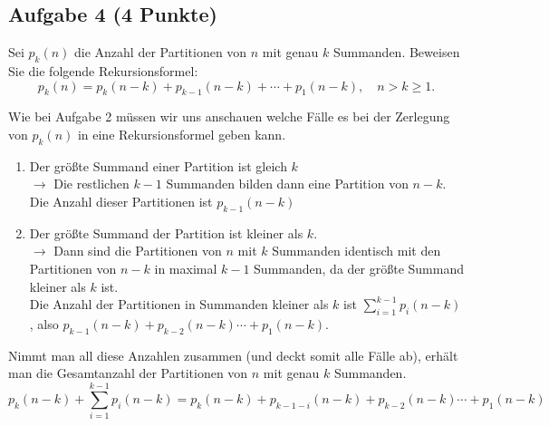 \documentclass{article} %
\begin{document}
\subsection*{Aufgabe 4 (4 Punkte)}

Sei \(p_k(n)\) die Anzahl der Partitionen von \(n\) mit genau \(k\) Summanden. Beweisen Sie die folgende Rekursionsformel:
\[
p_k(n) = p_k(n - k) + p_{k-1}(n - k) + \cdots + p_1(n - k), \quad n > k \geq 1.
\]
\begin{mybox}
Wie bei Aufgabe 2 müssen wir uns anschauen welche Fälle es bei der Zerlegung von $p_k(n)$ in eine Rekursionsformel geben kann. 
\begin{enumerate}
    \item Der größte Summand einer Partition ist gleich $k$ \\
    $\rightarrow$ Die restlichen $k-1$ Summanden bilden dann eine Partition von $n-k$. Die Anzahl dieser Partitionen ist $p_{k-1}(n-k)$
    \item Der größte Summand der Partition ist kleiner als $k$.  \\
    $\rightarrow$ Dann sind die Partitionen von $n$ mit $k$ Summanden identisch mit den Partitionen von $n-k$ in maximal $k-1$ Summanden, da der größte Summand kleiner als $k$ ist. \\
    Die Anzahl der Partitionen in Summanden kleiner als $k$ ist $\sum_{i=1}^{k-1} p_{i}(n-k)$, also $p_{k-1}(n-k) + p_{k-2}(n-k) \cdots + p_{1}(n-k)$. 
\end{enumerate} 
Nimmt man all diese Anzahlen zusammen (und deckt somit alle Fälle ab), erhält man die Gesamtanzahl der Partitionen von $n$ mit genau $k$ Summanden. 
\[
p_{k}(n-k) + \sum_{i=1}^{k-1} p_{i}(n-k) = p_{k}(n-k) + p_{k-1-i}(n-k) + p_{k-2}(n-k) \cdots + p_{1}(n-k)
\]
\end{mybox}
\end{document}

